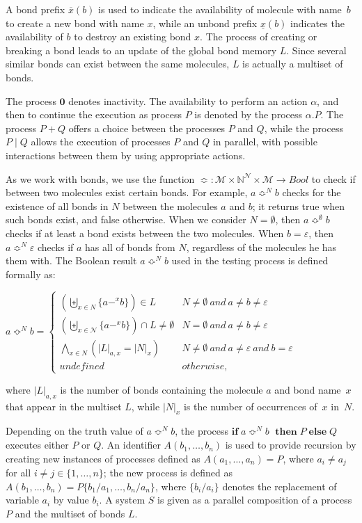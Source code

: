 \documentclass[runningheads]{llncs}
\newcommand{\N}{\mathbb{N}}
\newcommand{\mN}{\mathcal{N}}
\begin{document}
A bond prefix $\overline{x}(b)$ is used to indicate the availability of 
molecule with name~$b$ to create a new bond with name $x$, while an unbond 
prefix $\underline{x}(b)$ indicates the availability of $b$ to destroy an 
existing bond $x$. The process of creating or breaking a bond leads to an 
update of the global bond memory $L$. Since several similar bonds can exist 
between the same molecules, $L$ is actually a multiset of bonds.

The process $\textbf{0}$ denotes inactivity. The availability to perform an 
action $\alpha$, and then to continue the execution as process $P$ is denoted 
by the process $\alpha.P$. The process $P+Q$ offers a choice 
between the processes $P$ and $Q$, while the process $P \mid Q$ allows the 
execution of processes $P$ and $Q$ in parallel, with possible interactions 
between them by using appropriate actions.

As we work with bonds, we use the function $\Bumpeq: \mathcal{M}\times 
\N^{\mN} \times \mathcal{M} \rightarrow Bool$ to check if between two 
molecules exist certain bonds. For example, $a\Bumpeq^N b$ checks for the 
existence of all bonds in $N$ between the molecules $a$ and $b$; it 
returns true when such bonds exist, and false otherwise. When we consider 
$N=\emptyset$, then $a\Bumpeq^{\emptyset}b$ checks if at least a bond 
exists between the two molecules. When $b=\varepsilon$, then $a\Bumpeq^N 
{\varepsilon}$ checks if $a$ has all of bonds from $N$, regardless of 
the molecules he has them with. The Boolean result $a \Bumpeq^N b$ used 
in the testing process is defined formally as:
\smallskip

$a \Bumpeq^N b=\begin{cases}
\displaystyle(\biguplus_{x \in N} \{a-^x b\}) \in L & N \neq \emptyset~and ~a \neq b \neq \varepsilon\\
\displaystyle(\biguplus_{x \in \mN} \{a-^x b\}) \cap L \neq \emptyset & N = \emptyset~and ~a \neq b \neq \varepsilon\\
\displaystyle\bigwedge_{x \in N} (|L|_{a,x}=|N|_x) & N \neq \emptyset~and ~a \neq \varepsilon ~and~b = \varepsilon\\
undefined & otherwise,
\end{cases}$

\noindent where $|L|_{a,x}$ is the number of bonds containing the molecule 
$a$ and bond name~$x$ that appear in the multiset $L$, while $|N|_x$ is 
the number of occurrences of~$x$ in~$N$.

Depending on the truth value of $a \Bumpeq^N\!\! b $, the process 
$\textbf{if}\;a \Bumpeq^N\!\! b$ $\;\textbf{then}\;P\;\textbf{else}\;Q$ 
executes either $P$ or $Q$.  An identifier $ A(b_1,\ldots,b_n) $ is used 
to provide recursion by creating new instances of processes defined as 
$A(a_1,\ldots,a_n)=P$, where $a_i \neq a_j$ for all $i\neq j \in 
\{1,\ldots,n\}$; the new process is defined as $ A(b_1,\ldots,b_n) 
=P\{b_1/a_1,\ldots,b_n/a_n\}$, where $\{b_i/a_i\}$ denotes the replacement 
of variable $a_i$ by value $b_i$. A system $S$ is given as a parallel 
composition of a process $P$ and the multiset of bonds $L$.
\smallskip
\end{document}
